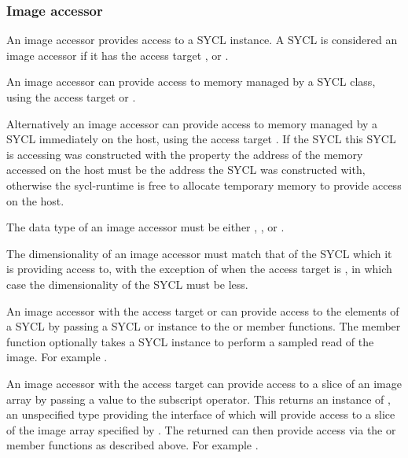 \subsubsection{Image accessor}
\label{sub.section.accessors.image}

An image accessor provides access to a SYCL  instance. A SYCL  is considered an image accessor if it has the access
target ,  or .
      
An image accessor can provide access to memory managed by a SYCL  class, using the access target  or
.

Alternatively an image accessor can provide access to memory managed by a SYCL
 immediately on the \gls{host}, using the access target
. If the SYCL  this
SYCL  is accessing was constructed with the property 
 the address of the memory accessed
on the \gls{host} must be the address the SYCL  was
constructed with, otherwise the \gls{sycl-runtime} is free to allocate
temporary memory to provide access on the \gls{host}.

The data type of an image accessor must be either , ,  or .

The dimensionality of an image accessor must match that of the SYCL
 which it is providing access to, with the exception of when
the access target is , in which case
the dimensionality of the SYCL  must be 
less.

An image accessor with the access target  or
 can provide access to the elements of a
SYCL  by passing a SYCL  or  instance to the  or  member
functions. The  member function optionally takes a SYCL
 instance to perform a sampled read of the image. For
example .

An image accessor with the access target  can provide access to a slice of an image array by
passing a  value to the subscript operator. This returns an
instance of , an unspecified type providing
the interface of  which will provide access
to a slice of the image array specified by . The
 returned can then provide access via the
 or  member functions as described above. For
example .

